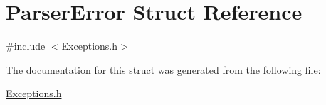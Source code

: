 \hypertarget{structParserError}{}\section{Parser\+Error Struct Reference}
\label{structParserError}


{\ttfamily \#include $<$Exceptions.\+h$>$}



The documentation for this struct was generated from the following file\+:\begin{DoxyCompactItemize}
\item 
\hyperlink{Exceptions_8h}{Exceptions.\+h}\end{DoxyCompactItemize}
